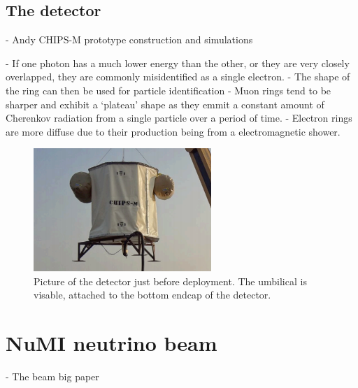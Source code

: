 \subsection{The \chipsm detector} %
\label{sec:chips_concept_m} %

- Andy CHIPS-M prototype construction and simulations~\cite{perch2015}

- If one photon has a much lower energy than the other, or they are very closely overlapped,
they are commonly misidentified as a single electron.
- The shape of the ring can then be used for particle identification
- Muon rings tend to be sharper and exhibit a `plateau' shape as they emmit a constant amount of
Cherenkov radiation from a single particle over a period of time.
- Electron rings are more diffuse due to their production being from a electromagnetic shower.

\begin{figure} %
    \includegraphics[width=0.6\textwidth]{diagrams/4-chips/chips_m.png}
    \caption[Picture of the \chipsm detector.]
    {Picture of the \chipsm detector just before deployment. The umbilical is visable, attached to
        the bottom endcap of the detector.}
    \label{fig:chips_m}
\end{figure}

\section{NuMI neutrino beam} %
\label{sec:chips_numi} %

- The \numi beam big paper~\cite{adamson2016}

